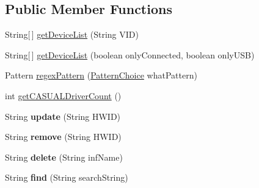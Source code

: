 \subsection*{Public Member Functions}
\begin{DoxyCompactItemize}
\item 
String\mbox{[}$\,$\mbox{]} \hyperlink{class_c_a_s_u_a_l_1_1communicationstools_1_1heimdall_1_1drivers_1_1_driver_operations_a60fb17ad7d7cdc8be006690081321e0c}{get\-Device\-List} (String V\-I\-D)
\item 
String\mbox{[}$\,$\mbox{]} \hyperlink{class_c_a_s_u_a_l_1_1communicationstools_1_1heimdall_1_1drivers_1_1_driver_operations_a12ed0cd12fe6778abe977c9daa676ce9}{get\-Device\-List} (boolean only\-Connected, boolean only\-U\-S\-B)
\item 
Pattern \hyperlink{class_c_a_s_u_a_l_1_1communicationstools_1_1heimdall_1_1drivers_1_1_driver_operations_a41b7e36a10acaecd1c3b8d0ac13da6f3}{regex\-Pattern} (\hyperlink{enum_c_a_s_u_a_l_1_1communicationstools_1_1heimdall_1_1drivers_1_1_driver_operations_1_1_pattern_choice}{Pattern\-Choice} what\-Pattern)
\item 
int \hyperlink{class_c_a_s_u_a_l_1_1communicationstools_1_1heimdall_1_1drivers_1_1_driver_operations_aa532a91dd356d8789948a73fd5ce3d5f}{get\-C\-A\-S\-U\-A\-L\-Driver\-Count} ()
\item 
\hypertarget{class_c_a_s_u_a_l_1_1communicationstools_1_1heimdall_1_1drivers_1_1_driver_operations_a64c61e6c787b52c9ce27fbd4f89ffc01}{String {\bfseries update} (String H\-W\-I\-D)}\label{class_c_a_s_u_a_l_1_1communicationstools_1_1heimdall_1_1drivers_1_1_driver_operations_a64c61e6c787b52c9ce27fbd4f89ffc01}

\item 
\hypertarget{class_c_a_s_u_a_l_1_1communicationstools_1_1heimdall_1_1drivers_1_1_driver_operations_a7d6f19eecacd20bfa974d8e89298273b}{String {\bfseries remove} (String H\-W\-I\-D)}\label{class_c_a_s_u_a_l_1_1communicationstools_1_1heimdall_1_1drivers_1_1_driver_operations_a7d6f19eecacd20bfa974d8e89298273b}

\item 
\hypertarget{class_c_a_s_u_a_l_1_1communicationstools_1_1heimdall_1_1drivers_1_1_driver_operations_a750fb48b629da9b416778a170fcce95e}{String {\bfseries delete} (String inf\-Name)}\label{class_c_a_s_u_a_l_1_1communicationstools_1_1heimdall_1_1drivers_1_1_driver_operations_a750fb48b629da9b416778a170fcce95e}

\item 
\hypertarget{class_c_a_s_u_a_l_1_1communicationstools_1_1heimdall_1_1drivers_1_1_driver_operations_a5197ee0d9dda30b791ccb82837b9a9f1}{String {\bfseries find} (String search\-String)}\label{class_c_a_s_u_a_l_1_1communicationstools_1_1heimdall_1_1drivers_1_1_driver_operations_a5197ee0d9dda30b791ccb82837b9a9f1}


\end{DoxyCompactItemize}
